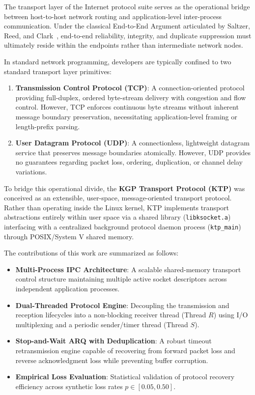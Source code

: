 \documentclass[11pt,a4paper]{article}
\begin{document}
The transport layer of the Internet protocol suite serves as the operational bridge between host-to-host network routing and application-level inter-process communication. Under the classical End-to-End Argument articulated by Saltzer, Reed, and Clark~\cite{saltzer1984end}, end-to-end reliability, integrity, and duplicate suppression must ultimately reside within the endpoints rather than intermediate network nodes. 

In standard network programming, developers are typically confined to two standard transport layer primitives:
\begin{enumerate}
    \item \textbf{Transmission Control Protocol (TCP)}: A connection-oriented protocol providing full-duplex, ordered byte-stream delivery with congestion and flow control. However, TCP enforces continuous byte streams without inherent message boundary preservation, necessitating application-level framing or length-prefix parsing.
    \item \textbf{User Datagram Protocol (UDP)}: A connectionless, lightweight datagram service that preserves message boundaries atomically. However, UDP provides no guarantees regarding packet loss, ordering, duplication, or channel delay variations.
\end{enumerate}

To bridge this operational divide, the \textbf{KGP Transport Protocol (KTP)} was conceived as an extensible, user-space, message-oriented transport protocol. Rather than operating inside the Linux kernel, KTP implements transport abstractions entirely within user space via a shared library (\texttt{libksocket.a}) interfacing with a centralized background protocol daemon process (\texttt{ktp\_main}) through POSIX/System V shared memory.

The contributions of this work are summarized as follows:
\begin{itemize}
    \item \textbf{Multi-Process IPC Architecture}: A scalable shared-memory transport control structure maintaining multiple active socket descriptors across independent application processes.
    \item \textbf{Dual-Threaded Protocol Engine}: Decoupling the transmission and reception lifecycles into a non-blocking receiver thread (Thread $R$) using I/O multiplexing and a periodic sender/timer thread (Thread $S$).
    \item \textbf{Stop-and-Wait ARQ with Deduplication}: A robust timeout retransmission engine capable of recovering from forward packet loss and reverse acknowledgment loss while preventing buffer corruption.
    \item \textbf{Empirical Loss Evaluation}: Statistical validation of protocol recovery efficiency across synthetic loss rates $p \in [0.05, 0.50]$.
\end{itemize}
\end{document}
